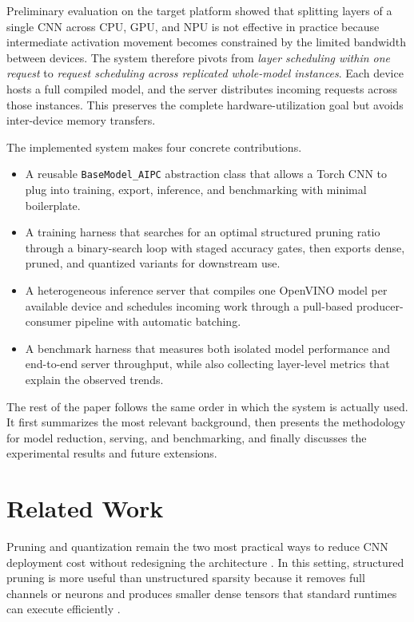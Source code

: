 \documentclass[conference]{IEEEtran}
\begin{document}
Preliminary evaluation on the target platform showed that splitting layers of a single CNN across CPU, GPU, and NPU is not effective in practice because intermediate activation movement becomes constrained by the limited bandwidth between devices. The system therefore pivots from \emph{layer scheduling within one request} to \emph{request scheduling across replicated whole-model instances}. Each device hosts a full compiled model, and the server distributes incoming requests across those instances. This preserves the complete hardware-utilization goal but avoids inter-device memory transfers.

The implemented system makes four concrete contributions.
\begin{itemize}
\item A reusable \texttt{BaseModel\_AIPC} abstraction class that allows a Torch CNN to plug into training, export, inference, and benchmarking with minimal boilerplate.
\item A training harness that searches for an optimal structured pruning ratio through a binary-search loop with staged accuracy gates, then exports dense, pruned, and quantized variants for downstream use.
\item A heterogeneous inference server that compiles one OpenVINO model per available device and schedules incoming work through a pull-based producer-consumer pipeline with automatic batching.
\item A benchmark harness that measures both isolated model performance and end-to-end server throughput, while also collecting layer-level metrics that explain the observed trends.
\end{itemize}

The rest of the paper follows the same order in which the system is actually used. It first summarizes the most relevant background, then presents the methodology for model reduction, serving, and benchmarking, and finally discusses the experimental results and future extensions.

\section{Related Work}
Pruning and quantization remain the two most practical ways to reduce CNN deployment cost without redesigning the architecture \cite{han2015learning,jacob2018quantization,krishnamoorthi2018quantizing}. In this setting, structured pruning is more useful than unstructured sparsity because it removes full channels or neurons and produces smaller dense tensors that standard runtimes can execute efficiently \cite{li2017pruning,he2017channel,molchanov2017pruning,liu2017network,luo2017thinet}.
\end{document}

